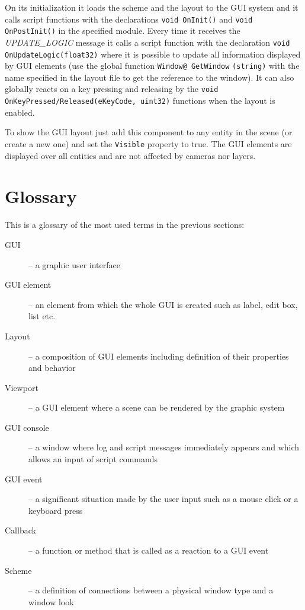 On its initialization it loads the scheme and the layout to the GUI system and it calls script functions with the declarations \verb/void OnInit()/ and \verb/void OnPostInit()/ in the specified module. Every time it receives the \emph{UPDATE\_LOGIC} message it calls a script function with the declaration \verb/void OnUpdateLogic(float32)/ where it is possible to update all information displayed by GUI elements (use the global function \verb/Window@ GetWindow/ \verb/(string)/ with the name specified in the layout file to get the reference to the window). It can also globally reacts on a key pressing and releasing by the \verb$void OnKeyPressed/Released(eKeyCode, uint32)$ functions when the layout is enabled.

To show the GUI layout just add this component to any entity in the scene (or create a new one) and set the \verb/Visible/ property to true. The GUI elements are displayed over all entities and are not affected by cameras nor layers.

\section{Glossary}
This is a glossary of the most used terms in the previous sections:

\begin{description}
  \item[GUI] -- a graphic user interface
  \item[GUI element] -- an element from which the whole GUI is created such as label, edit box, list etc.
  \item[Layout] -- a composition of GUI elements including definition of their properties and behavior
  \item[Viewport] -- a GUI element where a scene can be rendered by the graphic system
  \item[GUI console] -- a window where log and script messages immediately appears and which allows an input of script commands
  \item[GUI event] -- a significant situation made by the user input such as a mouse click or a keyboard press
  \item[Callback] -- a function or method that is called as a reaction to a GUI event
  \item[Scheme] -- a definition of connections between a physical window type and a window look
\end{description}